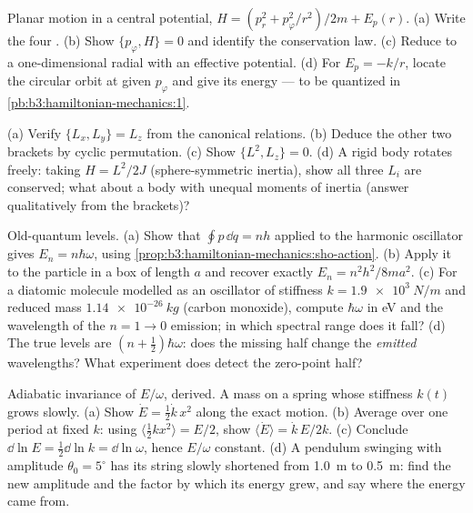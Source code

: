 \begin{exercise}[$\star\star$]\label{exo:b3:hamiltonian-mechanics:8}
Planar motion in a central potential, $H = (p_r^2 + p_\varphi^2/r^2)/2m
+ E_p(r)$. (a) Write the four . (b) Show $\{
p_\varphi, H\} = 0$ and identify the conservation law. (c) Reduce to a
one-dimensional radial  with an effective potential. (d)
For $E_p = -k/r$, locate the circular orbit at given $p_\varphi$ and
give its energy --- to be quantized in
\cref{pb:b3:hamiltonian-mechanics:1}.
\end{exercise}

\begin{exercise}[$\star\star$]\label{exo:b3:hamiltonian-mechanics:9}
(a) Verify $\{L_x, L_y\} = L_z$ from the canonical relations. (b)
Deduce the other two brackets by cyclic permutation. (c) Show
$\{L^2, L_z\} = 0$. (d) A rigid body rotates freely: taking $H =
L^2/2J$ (sphere-symmetric inertia), show all three $L_i$ are conserved;
what about a body with unequal moments of inertia (answer
qualitatively from the brackets)?
\end{exercise}

\begin{exercise}[$\star\star\star$]\label{exo:b3:hamiltonian-mechanics:10}
Old-quantum levels. (a) Show that $\oint p\,\dd q = nh$ applied to the
harmonic oscillator gives $E_n = n\hbar\omega$, using
\cref{prop:b3:hamiltonian-mechanics:sho-action}. (b) Apply it to the
particle in a box of length $a$ and recover exactly $E_n =
n^2h^2/8ma^2$. (c) For a diatomic molecule modelled as an oscillator
of stiffness $k = \qty{1.9e3}{N/m}$ and reduced mass $\qty{1.14e-26}
{kg}$ (carbon monoxide), compute $\hbar\omega$ in eV and the
wavelength of the $n = 1 \to 0$ emission; in which spectral range does
it fall? (d) The true levels are $(n + \tfrac12)\hbar\omega$: does the
missing half change the \emph{emitted} wavelengths? What experiment
does detect the zero-point half?
\end{exercise}

\begin{exercise}[$\star\star\star$]\label{exo:b3:hamiltonian-mechanics:11}
Adiabatic invariance of $E/\omega$, derived. A mass on a spring whose
stiffness $k(t)$ grows slowly. (a) Show $\dot E = \tfrac12\dot k\,
x^2$ along the exact motion. (b) Average over one period at fixed $k$:
using $\langle\tfrac12 kx^2\rangle = E/2$, show $\langle\dot E\rangle
= \dot k\,E/2k$. (c) Conclude $\dd\ln E = \tfrac12\dd\ln k = \dd\ln
\omega$, hence $E/\omega$ constant. (d) A pendulum swinging with
amplitude $\theta_0 = 5^\circ$ has its string slowly shortened from
\qty{1.0}{m} to \qty{0.5}{m}: find the new amplitude and the factor by
which its energy grew, and say where the energy came from.
\end{exercise}

